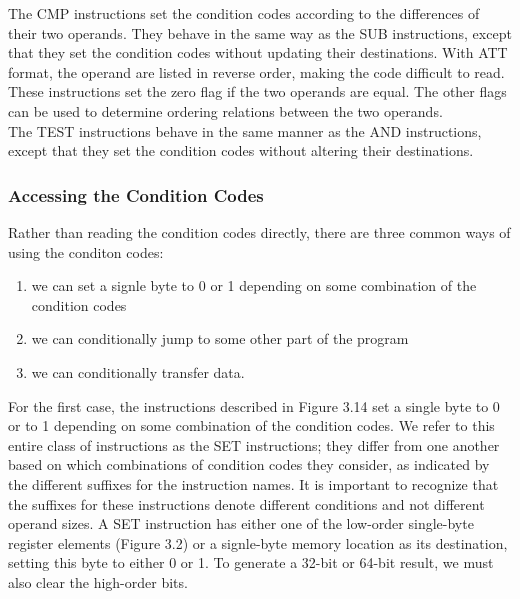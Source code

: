 \documentclass[11pt]{article}
\begin{document}
The CMP instructions set the condition codes according to the differences of their two operands. They behave in the same way as the SUB instructions, except that they set the condition codes without updating their destinations. With ATT format, the operand are listed in reverse order, making the code difficult to read. These instructions set the zero flag if the two operands are equal. The other flags can be used to determine ordering relations between the two operands.\\

The TEST instructions behave in the same manner as the AND instructions, except that they set the condition codes without altering their destinations.\\

\subsubsection{Accessing the Condition Codes}
\label{sec:org0e21d1f}

Rather than reading the condition codes directly, there are three common ways of using the conditon codes:\\
\begin{enumerate}
\item we can set a signle byte to 0 or 1 depending on some combination of the condition codes\\
\item we can conditionally jump to some other part of the program\\
\item we can conditionally transfer data.\\
\end{enumerate}


For the first case, the instructions described in Figure 3.14 set a single byte to 0 or to 1 depending on some combination of the condition codes. We refer to this entire class of instructions as the SET instructions; they differ from one another based on which combinations of condition codes they consider, as indicated by the different suffixes for the instruction names. It is important to recognize that the suffixes for these instructions denote different conditions and not different operand sizes. A SET instruction has either one of the low-order single-byte register elements (Figure 3.2) or a signle-byte memory location as its destination, setting this byte to either 0 or 1. To generate a 32-bit or 64-bit result, we must also clear the high-order bits.\\
\end{document}
